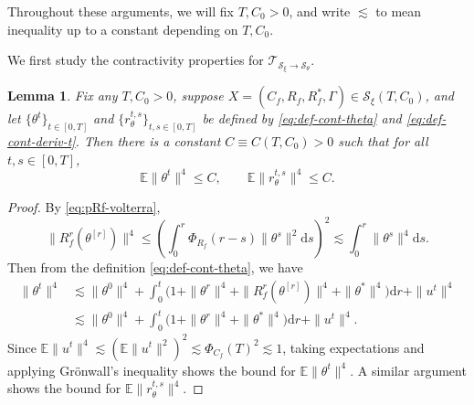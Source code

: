 \documentclass[11pt,letterpaper,reqno]{amsart}
\newtheorem{lem}[thm]{Lemma}
\theoremstyle{definition}
\def\d{\mathrm{d}}
\def\E{\mathbb{E}}
\def\cS{\mathcal{S}}
\def\Cf{C_f}
\def\Rf{R_f}
\def\pCf{\Phi_{\Cf}}
\def\pRf{\Phi_{\Rf}}
\def\trsfrmA{\mathcal{T}_{\mathcal{S}_\xi \to {\mathcal{S}}_\theta}}
\newcommand{\norm}[1]{\|#1\|}
\newcommand{\prn}[1]{\left({#1}\right)} %
\begin{document}
Throughout these arguments, we will fix $T,C_0>0$, and write
$\lesssim$ to mean inequality up to a constant depending on $T,C_0$.

We first study the contractivity properties for $\trsfrmA$.

\begin{lem}\label{lem:exist-unique-theta}
Fix any $T,C_0>0$, suppose $X=(C_f,R_f,R_f^*,\Gamma) \in
\cS_\xi(T,C_0)$, and let $\{\theta^t\}_{t \in [0,T]}$ and
$\{r_\theta^{t,s}\}_{t,s \in [0,T]}$ be defined
by \eqref{eq:def-cont-theta} and \eqref{eq:def-cont-deriv-t}.
Then there is a constant $C \equiv C(T,C_0)>0$ such that for all $t,s \in [0,T]$,
\[\E\|\theta^t\|^4 \leq C,
\qquad \E\|r_\theta^{t,s}\|^4 \leq C.\]
\end{lem}

\begin{proof}
By \eqref{eq:pRf-volterra},
\[\norm{R_f^{r}(\theta^{[r]})}^4 \leq \prn{\int_0^r \pRf(r-s)\norm{\theta^s}^2\d
s }^2\lesssim \int_0^r \norm{\theta^s}^4\d s.\]
Then from the definition \eqref{eq:def-cont-theta}, we have
\begin{align*}
    \norm{\theta^t}^4&\lesssim
\norm{\theta^0}^4+\int_0^t\Big(1+\norm{\theta^r}^4+\norm{R_f^{r}(\theta^{[r]})}^4+\norm{\theta^*}^4\Big)\d r+\norm{u^t}^4\\
    &\lesssim \norm{\theta^0}^4+\int_0^t
\Big(1+\norm{\theta^r}^4+\norm{\theta^*}^4\Big)\d r+\norm{u^t}^4.
\end{align*}
Since $\E\norm{u^t}^4 \lesssim \prn{\E\norm{u^t}^2}^2 \lesssim \pCf(T)^2 \lesssim 1$,
taking expectations and applying Gr\"onwall's inequality shows
the bound for $\E\|\theta^t\|^4$. A similar argument shows the bound
for $\E\|r_\theta^{t,s}\|^4$.
\end{proof}
\end{document}

